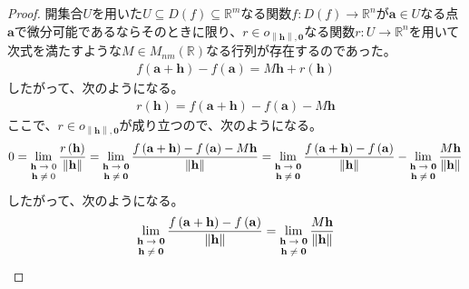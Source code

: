 \documentclass[dvipdfmx]{jsarticle}
\begin{document}
\begin{proof}
開集合$U$を用いた$U \subseteq D(f) \subseteq \mathbb{R}^{m}$なる関数$f:D(f) \rightarrow \mathbb{R}^{n}$が$\mathbf{a} \in U$なる点$\mathbf{a}$で微分可能であるならそのときに限り、$r \in o_{\left\| \mathbf{h} \right\|,\mathbf{0}}$なる関数$r:U \rightarrow \mathbb{R}^{n}$を用いて次式を満たすような$M \in M_{nm}(\mathbb{R})$なる行列が存在するのであった。
\begin{align*}
f\left( \mathbf{a} + \mathbf{h} \right) - f\left( \mathbf{a} \right) = M\mathbf{h} + r\left( \mathbf{h} \right)
\end{align*}
したがって、次のようになる。
\begin{align*}
r\left( \mathbf{h} \right) = f\left( \mathbf{a} + \mathbf{h} \right) - f\left( \mathbf{a} \right) - M\mathbf{h}
\end{align*}
ここで、$r \in o_{\left\| \mathbf{h} \right\|,\mathbf{0}}$が成り立つので、次のようになる。
\begin{align*}
0 = \lim_{\scriptsize \begin{matrix}
\mathbf{h} \rightarrow 0 \\
\mathbf{h} \neq 0 \\
\end{matrix}}\frac{r\left( \mathbf{h} \right)}{\left\| \mathbf{h} \right\|} = \lim_{\scriptsize \begin{matrix}
\mathbf{h} \rightarrow \mathbf{0} \\
\mathbf{h} \neq \mathbf{0} \\
\end{matrix}}\frac{f\left( \mathbf{a} + \mathbf{h} \right) - f\left( \mathbf{a} \right) - M\mathbf{h}}{\left\| \mathbf{h} \right\|} = \lim_{\scriptsize \begin{matrix}
\mathbf{h} \rightarrow \mathbf{0} \\
\mathbf{h} \neq \mathbf{0} \\
\end{matrix}}\frac{f\left( \mathbf{a} + \mathbf{h} \right) - f\left( \mathbf{a} \right)}{\left\| \mathbf{h} \right\|} - \lim_{\scriptsize \begin{matrix}
\mathbf{h} \rightarrow \mathbf{0} \\
\mathbf{h} \neq \mathbf{0} \\
\end{matrix}}\frac{M\mathbf{h}}{\left\| \mathbf{h} \right\|}
\end{align*}
したがって、次のようになる。
\begin{align*}
\lim_{\scriptsize \begin{matrix}
\mathbf{h} \rightarrow \mathbf{0} \\
\mathbf{h} \neq \mathbf{0} \\
\end{matrix}}\frac{f\left( \mathbf{a} + \mathbf{h} \right) - f\left( \mathbf{a} \right)}{\left\| \mathbf{h} \right\|} = \lim_{\scriptsize \begin{matrix}
\mathbf{h} \rightarrow \mathbf{0} \\
\mathbf{h} \neq \mathbf{0} \\
\end{matrix}}\frac{M\mathbf{h}}{\left\| \mathbf{h} \right\|}
\end{align*}
\end{proof}
\end{document}
